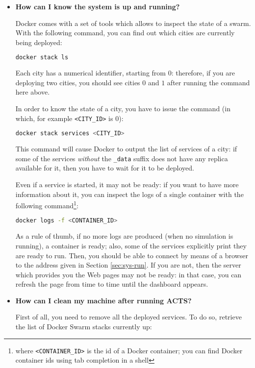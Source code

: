 \begin{itemize}
\item \textbf{How can I know the system is up and running?}

Docker comes with a set of tools which allows to inspect the state of a swarm.
With the following command, you can find out which cities are currently being
deployed:

\begin{lstlisting}[language=bash]
docker stack ls
\end{lstlisting}

Each city has a numerical identifier, starting from $0$: therefore, if you are
deploying two cities, you should see cities $0$ and $1$ after running the
command here above.

In order to know the state of a city, you have to issue the command (in which,
for example \texttt{<CITY\_ID>} is $0$):

\begin{lstlisting}[language=bash]
docker stack services <CITY_ID>
\end{lstlisting}

This command will cause Docker to output the list of services of a city: if
some of the services \emph{without} the \texttt{\_data} suffix does not have
any replica available for it, then you have to wait for it to be deployed.

Even if a service is started, it may not be ready: if you want to have more
information about it, you can inspect the logs of a single container with the
following command\footnote{where \texttt{<CONTAINER\_ID>} is the id of a Docker
container; you can find Docker container ids using tab completion in a shell}:

\begin{lstlisting}[language=bash]
docker logs -f <CONTAINER_ID>
\end{lstlisting}

As a rule of thumb, if no more logs are produced (when no simulation is
running), a container is ready; also, some of the services explicitly print
they are ready to run.
Then, you should be able to connect by means of a browser to the address given
in Section \ref{sec:sys-run}.
If you are not, then the server which provides you the Web pages may not be
ready: in that case, you can refresh the page from time to time until the
dashboard appears.

\item \textbf{How can I clean my machine after running ACTS?}

First of all, you need to remove all the deployed services.
To do so, retrieve the list of Docker Swarm stacks currently up:


\end{itemize}
